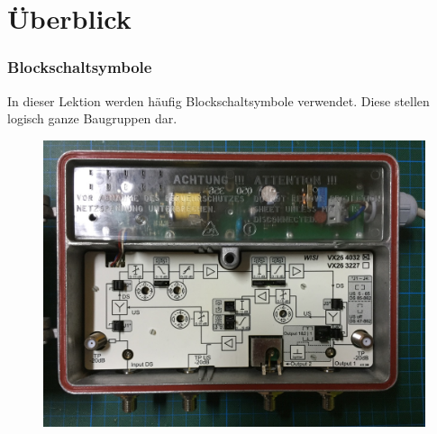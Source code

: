 

\subtitle{Technik Klasse A 13: \\
Frequenzaufbereitung \\[2em]}
\date{Stand 17.06.2016}


\section{Überblick}

\begin{frame}
  \frametitle{Blockschaltsymbole}
  In dieser Lektion werden häufig Blockschaltsymbole verwendet. Diese stellen logisch ganze Baugruppen dar.

  \begin{center}
    \begin{figure}
      \includegraphics[width=\textwidth,height=.65\textheight,keepaspectratio]{a13/IMG_4686.jpg}
    \end{figure}
  \end{center}
\end{frame}

